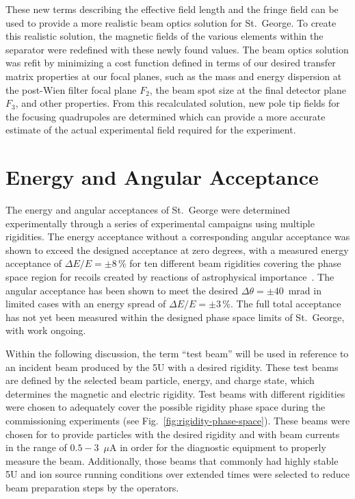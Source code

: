 These new terms describing the effective field length and the fringe
field can be used to provide a more realistic beam optics solution for
St.\ George. To create this realistic solution, the magnetic fields of
the various elements within the separator were redefined with these
newly found values. The beam optics solution was refit by minimizing a
cost function defined in terms of our desired transfer matrix properties
at our focal planes, such as the mass and energy dispersion at the
post-Wien filter focal plane $F_2$, the beam spot size at the final
detector plane $F_3$, and other properties. From this recalculated
solution, new pole tip fields for the focusing quadrupoles are
determined which can provide a more accurate estimate of the actual
experimental field required for the experiment.


\section{Energy and Angular Acceptance}
\label{sec:commissioning}

The energy and angular acceptances of St.\ George were determined
experimentally through a series of experimental campaigns using multiple
rigidities. The energy acceptance without a corresponding angular
acceptance was shown to exceed the designed acceptance at zero degrees,
with a measured energy acceptance of $\Delta E/E = \pm 8$\,\% for ten
different beam rigidities covering the phase space region for recoils
created by reactions of astrophysical importance~\cite{Meisel2017}. The
angular acceptance has been shown to meet the desired
$\Delta\theta = \pm 40$~mrad in limited cases with an energy spread of
$\Delta E/E = \pm 3$\,\%. The full total acceptance has not yet been
measured within the designed phase space limits of St.\ George, with
work ongoing.

Within the following discussion, the term ``test beam'' will be used in
reference to an incident beam produced by the 5U with a desired
rigidity. These test beams are defined by the selected beam particle,
energy, and charge state, which determines the magnetic and electric
rigidity. Test beams with different rigidities were chosen to adequately
cover the possible rigidity phase space during the commissioning
experiments (see Fig.~\ref{fig:rigidity-phase-space}). These beams were
chosen for to provide particles with the desired rigidity and with beam
currents in the range of $0.5 - 3$~$\mu$A in order for the diagnostic
equipment to properly measure the beam. Additionally, those beams that
commonly had highly stable 5U and ion source running conditions over
extended times were selected to reduce beam preparation steps by the
operators.

